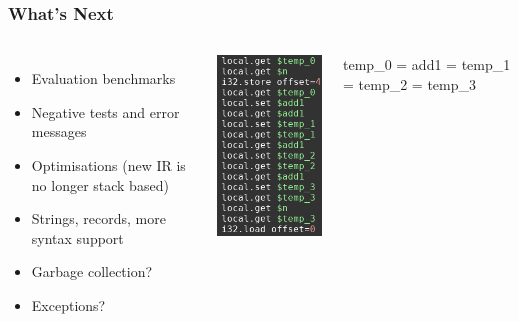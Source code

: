 \documentclass[12pt]{beamer}
\begin{document}
	\begin{frame}
		\frametitle{What's Next}
		\begin{columns}
			\begin{itemize}
				\item Evaluation benchmarks
				\item Negative tests and error messages
				\item Optimisations (new IR is no longer stack based)
				\item Strings, records, more syntax support
				\item Garbage collection?
				\item Exceptions?
			\end{itemize}
			\begin{center}
				\includegraphics[width=0.55\linewidth]{get-set}
			\end{center}
		    temp\_0 = add1 = temp\_1 = temp\_2 = temp\_3
		\end{columns}
		
	\end{frame}
	
\end{document}
